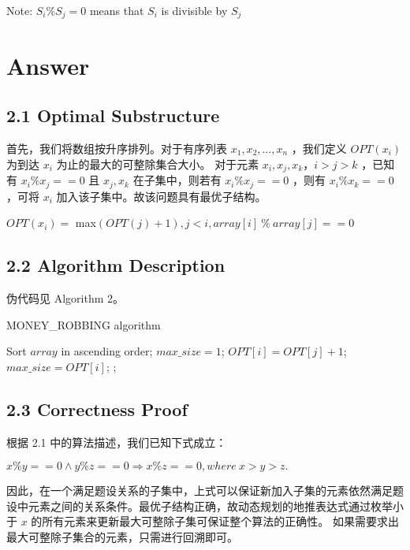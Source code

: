 \documentclass[UTF8]{ctexart}
\begin{document}
Note: $ S_{i} \% S_{j}=0$ means that $S_{i}$ is divisible by $S_{j}$
\section*{Answer}
\subsection*{2.1 Optimal Substructure }
首先，我们将数组按升序排列。对于有序列表 $x_1, x_2, \ldots , x_n$ ，我们定义 $OPT(x_i)$ 为到达 $x_i$ 为止的最大的可整除集合大小。
对于元素 $x_i, x_j, x_k， i > j > k$ ，已知有 $x_i \% x_j == 0$ 且 $x_j, x_k$ 在子集中，则若有 $x_i \% x_j == 0$ ，则有 $x_i \% x_k == 0$ ，可将 $x_i$ 加入该子集中。故该问题具有最优子结构。

$OPT(x_i) =$ max$(OPT(j) + 1), j < i, array[i]~ \% ~array[j] == 0$
\subsection*{2.2 Algorithm Description}
伪代码见 Algorithm 2。

\begin{algorithm}[h]
	\caption{MONEY\_ROBBING algorithm}
	\begin{algorithmic}[1]
        \State Sort $array$ in ascending order;
        \State $max\_size = 1$;
                    \State $OPT[i] = OPT[j] + 1$; 
                \EndIf
            \EndFor
            \State $max\_size = OPT[i]$;
            \EndIf
        \EndFor
        \State {};
        \EndFunction
	\end{algorithmic}
\end{algorithm}
\subsection*{2.3 Correctness Proof}
根据 2.1 中的算法描述，我们已知下式成立：

$x \% y == 0 \wedge y \% z == 0  \Rightarrow x \% z == 0, where ~x > y > z.$

因此，在一个满足题设关系的子集中，上式可以保证新加入子集的元素依然满足题设中元素之间的关系条件。最优子结构正确，故动态规划的地推表达式通过枚举小于 $x$ 的所有元素来更新最大可整除子集可保证整个算法的正确性。
如果需要求出最大可整除子集合的元素，只需进行回溯即可。
\end{document}
